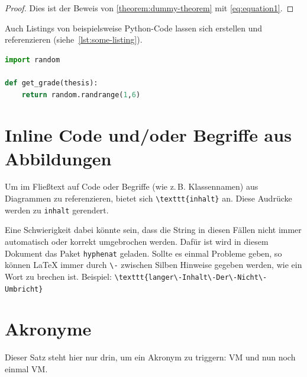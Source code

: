 \begin{proof}
Dies ist der Beweis von \cref{theorem:dummy-theorem} mit \cref{eq:equation1}.
\end{proof}


Auch Listings von beispielsweise Python-Code lassen sich erstellen und referenzieren
(siehe~\cref{lst:some-listing}).
\begin{lstlisting}[language=Python, caption=Python Listing, label=lst:some-listing]
import random
    
def get_grade(thesis):
    return random.randrange(1,6)
\end{lstlisting}


\section{Inline Code und/oder Begriffe aus Abbildungen}\label{sect-inline-code}

Um im Fließtext auf Code oder Begriffe (wie z.\,B. Klassennamen) aus Diagrammen zu referenzieren, bietet sich
\texttt{\textbackslash\-texttt\{inhalt\}}
an.
Diese Audrücke werden zu \texttt{inhalt} gerendert.

Eine Schwierigkeit dabei könnte sein, dass die String in diesen Fällen nicht immer automatisch oder korrekt umgebrochen werden.
Dafür ist wird in diesem Dokument das Paket \texttt{hyphenat} geladen.
Sollte es einmal Probleme geben, so können LaTeX immer durch \texttt{\textbackslash-} zwischen Silben Hinweise gegeben werden, wie ein Wort zu brechen ist.
Beispiel: \texttt{\textbackslash\-texttt\{langer\textbackslash-Inhalt\textbackslash-Der\textbackslash-Nicht\textbackslash-Umbricht\}}

\section{Akronyme}\label{acronyms}

Dieser Satz steht hier nur drin, um ein Akronym zu triggern: \ac{VM} und nun noch einmal \ac{VM}.
